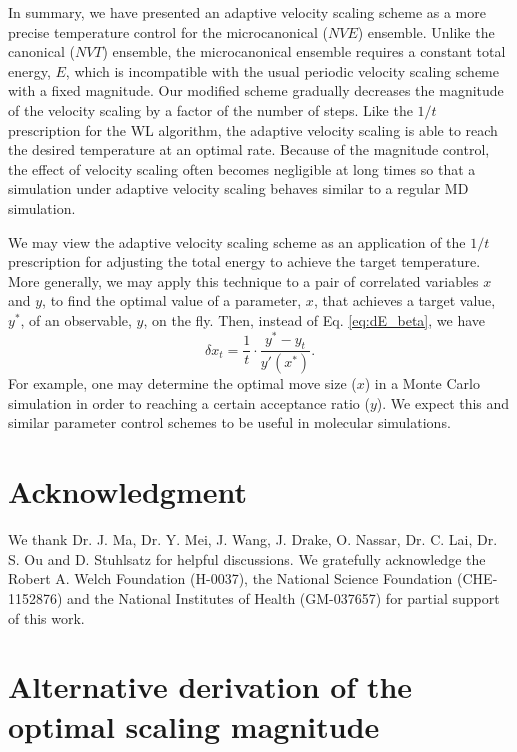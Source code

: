 \documentclass[reprint]{revtex4-1}
\begin{document}
In summary, we have presented an adaptive velocity scaling scheme
as a more precise temperature control for the microcanonical ($NVE$) ensemble.
%
Unlike the canonical ($NVT$) ensemble,
the microcanonical ensemble requires a constant total energy, $E$,
which is incompatible with the usual periodic velocity scaling scheme
with a fixed magnitude.
%
Our modified scheme gradually decreases the magnitude of the velocity scaling
by a factor of the number of steps.
%
Like the $1/t$ prescription\cite{
  belardinelli2007, belardinelli2007jcp, belardinelli2008,
  zhou2005, zhou2008, morozov2007}
for the WL algorithm\cite{wang2001, wang2001pre},
the adaptive velocity scaling is able to reach
the desired temperature at an optimal rate.
%
Because of the magnitude control,
the effect of velocity scaling often becomes negligible
at long times so that
a simulation under adaptive velocity scaling
behaves similar to a regular MD simulation.

We may view the adaptive velocity scaling scheme
as an application of the $1/t$ prescription
for adjusting the total energy
to achieve the target temperature.
%
More generally, we may apply this technique
to a pair of correlated variables $x$ and $y$,
to find the optimal value of a parameter, $x$,
that achieves a target value, $y^*$, of an observable, $y$,
on the fly.
%
Then, instead of Eq. \eqref{eq:dE_beta},
we have
$$
\delta x_t = \frac 1 t
\cdot
\frac{ y^* - y_t }
     { y'(x^*) }
.
$$
%
For example, one may determine the optimal move size ($x$)
in a Monte Carlo simulation
in order to reaching a certain acceptance ratio ($y$).
%
We expect this and similar parameter control schemes
to be useful in molecular simulations.




\section{Acknowledgment}

We thank Dr. J. Ma, Dr. Y. Mei, J. Wang,
J. Drake, O. Nassar, Dr. C. Lai, Dr. S. Ou and D. Stuhlsatz
for helpful discussions.
We gratefully acknowledge the Robert A. Welch Foundation (H-0037),
the National Science Foundation (CHE-1152876)
and
the National Institutes of Health (GM-037657) for partial support of this work.
%


\appendix


\section{\label{sec:error}
  Alternative derivation of
  the optimal scaling magnitude
}
\end{document}
